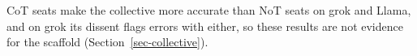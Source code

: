 CoT seats make the collective more accurate than NoT seats on
grok and Llama, and on grok its dissent flags errors with either, so
these results are not evidence for the scaffold (Section~\ref{sec-collective}).
